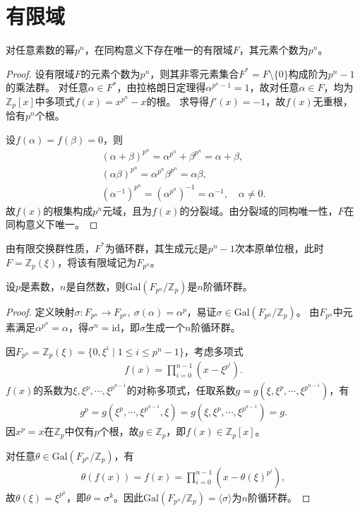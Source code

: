 \documentclass[../../main.tex]{subfiles}%
\begin{document}
\section{有限域}

\begin{theorem}
对任意素数的幂$p^n$，在同构意义下存在唯一的有限域$F$，其元素个数为$p^n$。
\end{theorem}
\begin{proof}
设有限域$F$的元素个数为$p^n$，则其非零元素集合$F^*=F\setminus\{0\}$构成阶为$p^n-1$的乘法群。
对任意$\alpha\in F^*$，由拉格朗日定理得$\alpha^{p^n-1}=1$，故对任意$\alpha\in F$，均为$\mathbb{Z}_p[x]$中多项式$f(x)=x^{p^n}-x$的根。
求导得$f'(x)=-1$，故$f(x)$无重根，恰有$p^n$个根。

设$f(\alpha)=f(\beta)=0$，则
\begin{align*}
(\alpha+\beta)^{p^n}=\alpha^{p^n}+\beta^{p^n}=\alpha+\beta,\\
(\alpha\beta)^{p^n}=\alpha^{p^n}\beta^{p^n}=\alpha\beta,\\
(\alpha^{-1})^{p^n}=(\alpha^{p^n})^{-1}=\alpha^{-1},\quad \alpha\neq0.
\end{align*}
故$f(x)$的根集构成$p^n$元域，且为$f(x)$的分裂域。由分裂域的同构唯一性，$F$在同构意义下唯一。
\end{proof}

\begin{remark}
由有限交换群性质，$F^*$为循环群，其生成元$\xi$是$p^n-1$次本原单位根，此时$F=\mathbb{Z}_p(\xi)$，将该有限域记为$F_{p^n}$。
\end{remark}

\begin{theorem}
设$p$是素数，$n$是自然数，则$\mathrm{Gal}(F_{p^n}/\mathbb{Z}_p)$是$n$阶循环群。
\end{theorem}
\begin{proof}
定义映射$\sigma:F_{p^n}\to F_{p^n},\ \sigma(\alpha)=\alpha^p$，易证$\sigma\in\mathrm{Gal}(F_{p^n}/\mathbb{Z}_p)$。
由$F_{p^n}$中元素满足$\alpha^{p^n}=\alpha$，得$\sigma^n=\mathrm{id}$，即$\sigma$生成一个$n$阶循环群。

因$F_{p^n}=\mathbb{Z}_p(\xi)=\{0,\xi^i\mid 1\leqslant i\leqslant p^n-1\}$，考虑多项式
\begin{align*}
f(x)=\prod\limits_{i=0}^{n-1}(x-\xi^{p^i}).
\end{align*}
$f(x)$的系数为$\xi,\xi^p,\cdots,\xi^{p^{n-1}}$的对称多项式，任取系数$g=g(\xi,\xi^p,\cdots,\xi^{p^{n-1}})$，有
\begin{align*}
g^p=g(\xi^p,\cdots,\xi^{p^{n-1}},\xi)=g(\xi,\xi^p,\cdots,\xi^{p^{n-1}})=g.
\end{align*}
因$x^p=x$在$\mathbb{Z}_p$中仅有$p$个根，故$g\in\mathbb{Z}_p$，即$f(x)\in\mathbb{Z}_p[x]$。

对任意$\theta\in\mathrm{Gal}(F_{p^n}/\mathbb{Z}_p)$，有
\begin{align*}
\theta(f(x))=f(x)=\prod\limits_{i=0}^{n-1}(x-\theta(\xi)^{p^i}),
\end{align*}
故$\theta(\xi)=\xi^{p^k}$，即$\theta=\sigma^k$。因此$\mathrm{Gal}(F_{p^n}/\mathbb{Z}_p)=\langle\sigma\rangle$为$n$阶循环群。
\end{proof}
\end{document}
